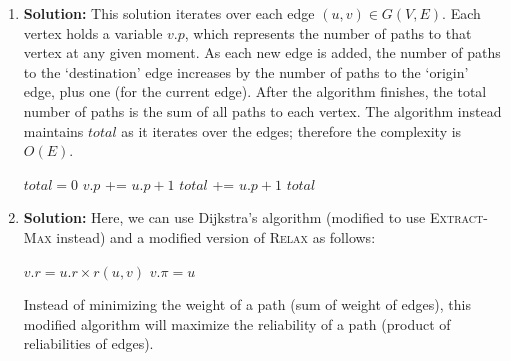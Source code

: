 \documentclass{article}
\begin{document}
\begin{enumerate}
\item \textbf{Solution:} 
This solution iterates over each edge $(u,v) \in G(V,E)$. Each vertex holds a variable $v.p$, which represents the number of paths to that vertex at any given moment. As each new edge is added, the number of paths to the `destination' edge increases by the number of paths to the `origin' edge, plus one (for the current edge). After the algorithm finishes, the total number of paths is the sum of all paths to each vertex. The algorithm instead maintains $total$ as it iterates over the edges; therefore the complexity is $O(E)$.
    \begin{algorithm}[H]
    \caption{}
    \begin{algorithmic}
    \STATE $total = 0$
        \STATE $v.p$ += $u.p + 1$
        \STATE $total$ += $u.p + 1$
    \ENDFOR
    \RETURN $total$
    \end{algorithmic}
    \end{algorithm}

\item \textbf{Solution:}
Here, we can use Dijkstra's algorithm (modified to use \textsc{Extract-Max} instead) and a modified version of \textsc{Relax} as follows:

    \begin{algorithm}[H]
    \caption{}
    \begin{algorithmic}
        \STATE $v.r = u.r \times r(u,v)$
        \STATE $v.\pi = u$
    \ENDIF
    \end{algorithmic}
    \end{algorithm}

Instead of minimizing the weight of a path (sum of weight of edges), this modified algorithm will maximize the reliability of a path (product of reliabilities of edges).


\end{enumerate}
\end{document}
